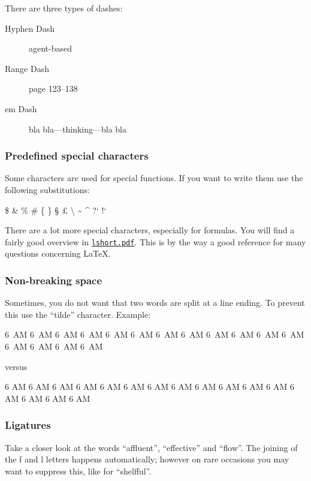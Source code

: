 \documentclass[numbered]{ivt-style/standard}\usepackage[]{graphicx}\usepackage[]{xcolor}
\begin{document}
There are three types of dashes:
\begin{description}
  \item[Hyphen Dash] agent-based
  \item[Range Dash] page 123--138
  \item[em Dash] bla bla---thinking---bla bla
\end{description}

\subsubsection{Predefined special characters}

Some characters are used for special functions. If you want to write
them use the following substitutions:

\$
\&
\%
\#
\{
\}
%
\S{}
\pounds{}
\textbackslash{}
\textasciitilde{}
\textasciicircum{}
%
?`
!`

There are a lot more special characters, especially for formulas.
You will find a fairly good overview in
\href{http://www.ctan.org/tex-archive/info/lshort/english/lshort.pdf}{\texttt{lshort.pdf}}.
This is by the way a good reference for many questions concerning \LaTeX{}.

\subsubsection{Non-breaking space}

Sometimes, you do not want that two words are split at a line ending.
To prevent this use the ``tilde'' character. Example:

6~AM 6~AM 6~AM 6~AM 6~AM 6~AM 6~AM 6~AM 6~AM 6~AM 6~AM 6~AM 6~AM 6~AM
6~AM 6~AM

versus

6 AM 6 AM 6 AM 6 AM 6 AM 6 AM 6 AM 6 AM 6 AM 6 AM 6 AM 6 AM 6 AM 6 AM
6 AM 6 AM

\subsubsection{Ligatures}

Take a closer look at the words ``affluent'', ``effective'' and ``flow''.
The joining of the f and l letters
happens automatically; however on rare occasions
you may want to
suppress this, like for ``shelf{}ful''.





%
\end{document}
